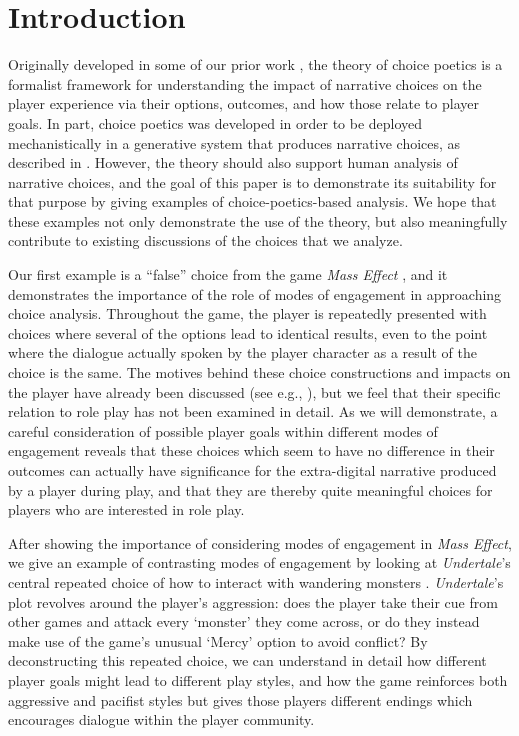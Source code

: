\documentclass[arts,article,submit,moreauthors,pdftex,10pt,a4paper]{Definitions/mdpi}
\begin{document}
\maketitle

\section{Introduction}

Originally developed in some of our prior work \citep{mawhorter2014towards,mawhorter2015intentionally,mawhorter2015generating,mawhorter2016artificial}, the theory of choice poetics is a formalist framework for understanding the impact of narrative choices on the player experience via their options, outcomes, and how those relate to player goals.
%
In part, choice poetics was developed in order to be deployed mechanistically in a generative system that produces narrative choices, as described in \citep{mawhorter2015generating,mawhorter2016artificial}.
%
However, the theory should also support human analysis of narrative choices, and the goal of this paper is to demonstrate its suitability for that purpose by giving examples of choice-poetics-based analysis.
%
We hope that these examples not only demonstrate the use of the theory, but also meaningfully contribute to existing discussions of the choices that we analyze.


Our first example is a ``false'' choice from the game \emph{Mass Effect} \citep{bioware2007mass}, and it demonstrates the importance of the role of modes of engagement in approaching choice analysis.
%
Throughout the game, the player is repeatedly presented with choices where several of the options lead to identical results, even to the point where the dialogue actually spoken by the player character as a result of the choice is the same.
%
The motives behind these choice constructions and impacts on the player have already been discussed (see e.g., \cite{jorgensen2010game,bizzocchi2012mass,boyan2015massively}), but we feel that their specific relation to role play has not been examined in detail.
%
As we will demonstrate, a careful consideration of possible player goals within different modes of engagement reveals that these choices which seem to have no difference in their outcomes can actually have significance for the extra-digital narrative produced by a player during play, and that they are thereby quite meaningful choices for players who are interested in role play.


After showing the importance of considering modes of engagement in \emph{Mass Effect}, we give an example of contrasting modes of engagement by looking at \emph{Undertale}'s central repeated choice of how to interact with wandering monsters \citep{fox2015undertale}.
%
\emph{Undertale}'s plot revolves around the player's aggression: does the player take their cue from other games and attack every `monster' they come across, or do they instead make use of the game's unusual `Mercy' option to avoid conflict?
%
By deconstructing this repeated choice, we can understand in detail how different player goals might lead to different play styles, and how the game reinforces both aggressive and pacifist styles but gives those players different endings which encourages dialogue within the player community.
\end{document}
